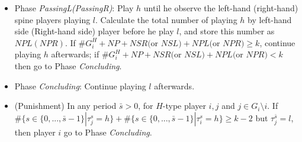 \documentclass[12pt,letter]{article}
\theoremstyle{remark}
\theoremstyle{remark}
\theoremstyle{claim}
\begin{document}
\begin{itemize}
\item Phase \textit{PassingL(PassingR)}: Play $h$ until he observe the left-hand (right-hand) spine players playing $l$. Calculate the total number of playing $h$ by left-hand side (Right-hand side) player before he play $l$, and store this number as $NPL(NPR)$. If $\#G^H_i+NP+NSR($or $NSL)+NPL($or $NPR)\geq k$, continue playing $h$ afterwards; if $\#G^H_i+NP+NSR($or $NSL)+NPL($or $NPR)< k$ then go to Phase \textit{Concluding}. 

\item Phase \textit{Concluding}: Continue playing $l$ afterwards.

\item (Punishment) In any period $\bar{s}>0$, for $H$-type player $i,j$ and $j\in G_i\setminus i$. If $\#\{s\in\{0,...,\bar{s}-1\}|\tau^s_j=h\}+\#\{s\in\{0,...,\bar{s}-1\}|\tau^s_i=h\}\geq k-2$ but $\tau^{\bar{s}}_j=l$, then player $i$ go to Phase \textit{Concluding}.

\end{itemize}

\bigskip
\end{document}
